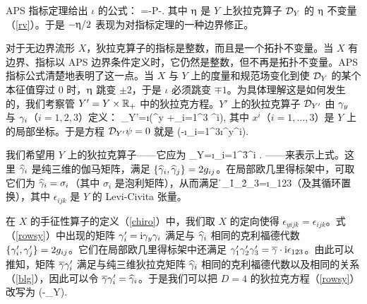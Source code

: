 APS 指标定理给出 $\iota$ 的公式：
\be\label{trof}\iota=\hA-P-. \ee
其中 $\upeta$ 是 $Y$ 上狄拉克算子 ${\mathcal D}_Y$ 的 $\upeta$ 不变量（\ref{rv}）。于是 $-\upeta/2$ 表现为对指标定理的一种边界修正。

对于无边界流形 $X$，狄拉克算子的指标是整数，而且是一个拓扑不变量。当 $X$ 有边界、指标以 APS 边界条件定义时，它仍然是整数，但不再是拓扑不变量。APS 指标公式清楚地表明了这一点。当 $X$ 与 $Y$ 上的度量和规范场变化到使 ${\mathcal D}_Y$ 的某个本征值穿过 0 时，$\upeta$ 跳变 $\pm 2$，于是 $\iota$ 必须跳变 $\mp 1$。为具体理解这是如何发生的，我们考察管 $Y'=Y\times {\mathbb{R}}_+$ 中的狄拉克方程。$Y'$ 上的狄拉克算子 ${\mathcal D}_{Y'}$ 由 ${\gamma}_y$ 与 ${\gamma}_i$（$i=1,2,3$）定义：
\be \label{drowsy}\D_{Y'}=\i\left(\g^y +\sum_{i=1}^3 \g^i\right), \ee
其中 $x^i$（$i=1,\dots,3$）是 $Y$ 上的局部坐标。于是方程 ${\mathcal D}_{Y'}\psi=0$ 就是
\be\label{rowsy}\left(-\i\sum_{i=1}^3\i\g^y\g^i\right). \ee

我们希望用 $Y$ 上的狄拉克算子------它应为
\be\label{owsy}\D_Y=\i\sum_{i=1}^3\h\g^i . \ee
------来表示上式。这里 $\widehat {{\gamma}}_i$ 是纯三维的伽马矩阵，满足 $\{\widehat{{\gamma}}_i,\widehat{{\gamma}}_j\}=2g_{ij}$。在局部欧几里得标架中，可取它们为 $\widehat {{\gamma}}_i=\sigma_i$（其中 $\sigma_i$ 是泡利矩阵），从而满足 \be\label{blg}\h\g_1\h\g_2\h\g_3=\i\epsilon_{123}\ee（及其循环置换），其中 $\epsilon_{ijk}$ 是 $Y$ 的 Levi-Civita 张量。


在 $X$ 的手征性算子的定义（\ref{chiro}）中，我们取 $X$ 的定向使得 $\epsilon_{yijk}=\epsilon_{ijk}$。式（\ref{rowsy}）中出现的矩阵 ${\gamma}'_i={\mathrm i}{\gamma}_y {\gamma}_i$ 满足与 $\widehat {{\gamma}}_i$ 相同的克利福德代数 $\{{\gamma}'_i,{\gamma}'_j\}=2g_{ij}$。它们在局部欧几里得标架中还满足 ${\gamma}'_1{\gamma}'_2{\gamma}'_3={\overline\gamma} \cdot {\mathrm i} \epsilon_{123}$。由此可以推知，矩阵 ${\overline\gamma} {\gamma}'_i$ 满足与纯三维狄拉克矩阵 $\widehat{{\gamma}}_i$ 相同的克利福德代数以及相同的关系（\ref{blg}），因此可以令 ${\overline\gamma}{\gamma}'_i=\widehat{{\gamma}}_i$。于是我们可以把 $D=4$ 的狄拉克方程（\ref{rowsy}）改写为
\be\label{wsy}\left(-\bg\D_Y\right).\ee

